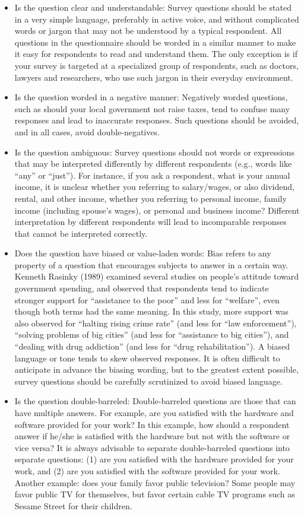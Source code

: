 \begin{itemize}
	\item Is the question clear and understandable: Survey questions should be stated in a very 	simple language, preferably in active voice, and without complicated words or jargon 	that may not be understood by a typical respondent. All questions in the questionnaire 	should be worded in a similar manner to make it easy for respondents to read and 	understand them. The only exception is if your survey is targeted at a specialized group 	of respondents, such as doctors, lawyers and researchers, who use such jargon in their 	everyday environment.
	\item Is the question worded in a negative manner: Negatively worded questions, such as 	should your local government not raise taxes, tend to confuse many responses and lead to inaccurate responses. Such questions should be avoided, and in all cases, avoid double-negatives.
	\item Is the question ambiguous: Survey questions should not words or expressions that may be interpreted differently by different respondents (e.g., words like “any” or “just”). For instance, if you ask a respondent, what is your annual income, it is unclear whether you referring to salary/wages, or also dividend, rental, and other income, whether you referring to personal income, family income (including spouse’s wages), or personal and business income? Different interpretation by different respondents will lead to incomparable responses that cannot be interpreted correctly.
	\item Does the question have biased or value-laden words: Bias refers to any property of a question that encourages subjects to answer in a certain way. Kenneth Rasinky (1989) examined several studies on people’s attitude toward government spending, and observed that respondents tend to indicate stronger support for “assistance to the poor” and less for “welfare”, even though both terms had the same meaning. In this study, 	more support was also observed for “halting rising crime rate” (and less for “law enforcement”), “solving problems of big cities” (and less for “assistance to big cities”), 	and “dealing with drug addiction” (and less for “drug rehabilitation”). A biased language or tone tends to skew observed responses. It is often difficult to anticipate in advance the biasing wording, but to the greatest extent possible, survey questions should be carefully scrutinized to avoid biased language.
	\item Is the question double-barreled: Double-barreled questions are those that can have multiple answers. For example, are you satisfied with the hardware and software provided for your work? In this example, how should a respondent answer if he/she is satisfied with the hardware but not with the software or vice versa? It is always advisable to separate double-barreled questions into separate questions: (1) are you satisfied with the hardware provided for your work, and (2) are you satisfied with the software provided for your work. Another example: does your family favor public television? Some people may favor public TV for themselves, but favor certain cable TV programs such as Sesame Street for their children.

\end{itemize}
